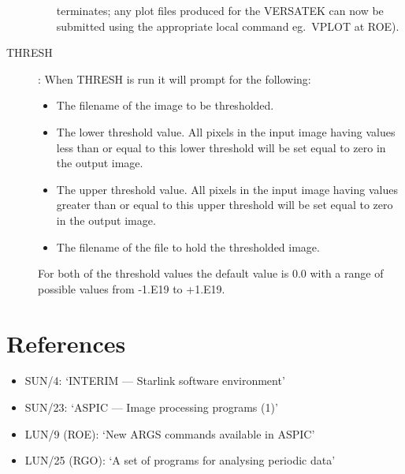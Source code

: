 \begin{description}
\begin{itemize}
terminates; any plot files produced for the VERSATEK can now be submitted using
the appropriate local command eg.\ VPLOT at ROE).
\end{itemize}
\item [THRESH]:
When THRESH is run it will prompt for the following:
\begin{itemize}
\item The filename of the image to be thresholded.
\item The lower threshold value.
All pixels in the input image having values less than or equal to this lower
threshold will be set equal to zero in the output image.
\item The upper threshold value.
All pixels in the input image having values greater than or equal to this upper
threshold will be set equal to zero in the output image.
\item The filename of the file to hold the thresholded image.
\end{itemize}
For both of the threshold values the default value is 0.0 with a range of
possible values from -1.E19 to +1.E19.
\end{description}

\section {References}

\begin{itemize}
\item SUN/4: `INTERIM --- Starlink software environment'
\item SUN/23: `ASPIC --- Image processing programs (1)'
\item LUN/9 (ROE): `New ARGS commands available in ASPIC'
\item LUN/25 (RGO): `A set of programs for analysing periodic data'
\end{itemize}

